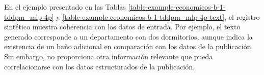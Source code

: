 \newpage


\newpage


\newpage

\newpage
En el ejemplo presentado en las Tablas \ref{table-example-economicos-b-1-tddpm_mlp-4p} y \ref{table-example-economicos-b-1-tddpm_mlp-4p-text}, el registro sintético muestra coherencia con los datos de entrada. Por ejemplo, el texto generado corresponde a un departamento con dos dormitorios, aunque indica la existencia de un baño adicional en comparación con los datos de la publicación. Sin embargo, no proporciona otra información relevante que pueda correlacionarse con los datos estructurados de la publicación.

